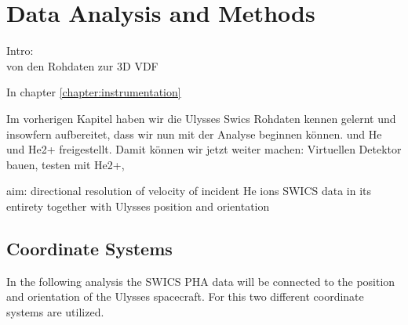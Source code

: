 
\chapter{Data Analysis and Methods} %

\label{chapter:data} 



Intro:\\
von den Rohdaten zur 3D VDF

In chapter \ref{chapter:instrumentation} 

Im vorherigen Kapitel haben wir die Ulysses Swics Rohdaten kennen gelernt und insowfern aufbereitet, dass wir nun mit der Analyse beginnen können. 
und He und He2+ freigestellt. Damit können wir jetzt weiter machen: Virtuellen Detektor bauen, testen mit He2+, 

aim: directional resolution of velocity of incident He ions
SWICS data in its entirety
together with
Ulysses position and orientation 



\section{Coordinate Systems}
In the following analysis the SWICS PHA data will be connected to the position and orientation of the Ulysses spacecraft. For this two different coordinate systems are utilized.

%
